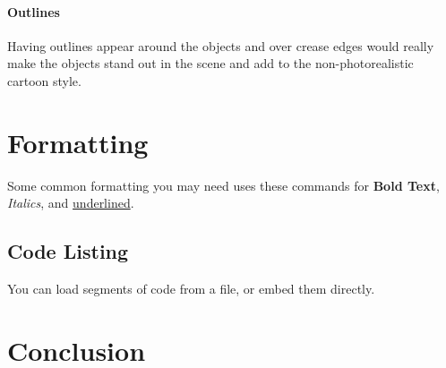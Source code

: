 \documentclass[10pt, a4paper]{article}
\begin{document}
	\paragraph{Outlines}
	Having outlines appear around the objects and over crease edges would really make the objects stand out in the scene and add to the non-photorealistic cartoon style.
	
	\section{Formatting}
	Some common formatting you may need uses these commands for \textbf{Bold Text}, \textit{Italics}, and \underline{underlined}.
	
	\subsection{Code Listing}
    You can load segments of code from a file, or embed them directly.
	
\section{Conclusion}	



		
\end{document}
